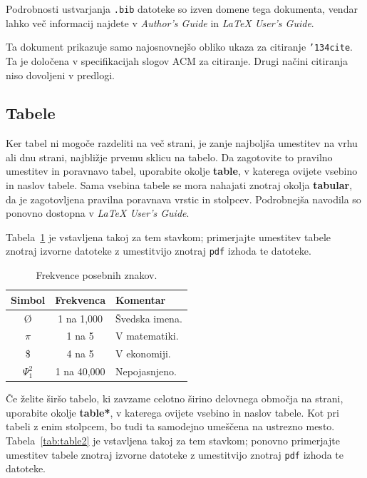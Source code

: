 \documentclass[article,slovene]{stucosrec}
\newcommand{\latex}{\LaTeX\xspace}
\begin{document}
	Podrobnosti ustvarjanja \texttt{.bib} datoteke so izven domene tega dokumenta, vendar lahko več informacij najdete v \textit{Author's Guide} in \textit{\latex User's Guide}\cite{Lamport:LaTeX}.

	Ta dokument prikazuje samo najosnovnejšo obliko ukaza za citiranje \texttt{{\char'134}cite}.
	Ta je določena v specifikacijah slogov ACM za citiranje.
	Drugi načini citiranja niso dovoljeni v predlogi.
	
	\subsection{Tabele}
	
	Ker tabel ni mogoče razdeliti na več strani, je zanje najboljša umestitev na vrhu ali dnu strani, najbližje prvemu sklicu na tabelo.
	Da zagotovite to pravilno umestitev in poravnavo tabel, uporabite okolje \textbf{table}, v katerega ovijete vsebino in naslov tabele.
	Sama vsebina tabele se mora nahajati znotraj okolja \textbf{tabular}, da je zagotovljena pravilna poravnava vrstic in stolpcev.
	Podrobnejša navodila so ponovno dostopna v \textit{\latex User's Guide}.
		
	Tabela~\ref{tab:table1} je vstavljena takoj za tem stavkom; primerjajte umestitev tabele znotraj izvorne datoteke z umestitvijo znotraj \texttt{pdf} izhoda te datoteke.
	
	\begin{table}
		\centering
		\caption{Frekvence posebnih znakov.}
		\label{tab:table1}
		\begin{tabular}{|c|c|l|} \hline
			Simbol&Frekvenca&Komentar\\ \hline
			\O & 1 na 1,000& Švedska imena.\\ \hline
			$\pi$ & 1 na 5& V matematiki.\\ \hline
			\$ & 4 na 5 & V ekonomiji.\\ \hline
			$\Psi^2_1$ & 1 na 40,000& Nepojasnjeno. \\ \hline
		\end{tabular}
	\end{table}

	Če želite širšo tabelo, ki zavzame celotno širino delovnega območja na strani, uporabite okolje \textbf{table*}, v katerega ovijete vsebino in naslov tabele.
	Kot pri tabeli z enim stolpcem, bo tudi ta samodejno umeščena na ustrezno mesto.
	Tabela~\ref{tab:table2} je vstavljena takoj za tem stavkom; ponovno primerjajte umestitev tabele znotraj izvorne datoteke z umestitvijo znotraj \texttt{pdf} izhoda te datoteke.
	
\end{document}

